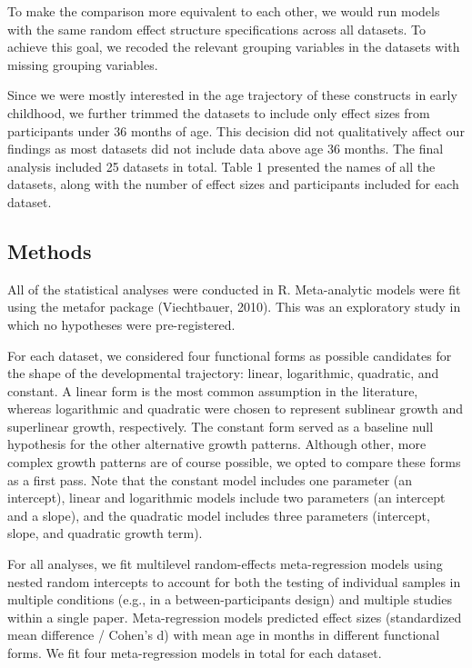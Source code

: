 \documentclass[
  man]{apa6}
\begin{document}
To make the comparison more equivalent to each other, we would run models with the same random effect structure specifications across all datasets. To achieve this goal, we recoded the relevant grouping variables in the datasets with missing grouping variables.

Since we were mostly interested in the age trajectory of these constructs in early childhood, we further trimmed the datasets to include only effect sizes from participants under 36 months of age. This decision did not qualitatively affect our findings as most datasets did not include data above age 36 months. The final analysis included 25 datasets in total. Table 1 presented the names of all the datasets, along with the number of effect sizes and participants included for each dataset.

\hypertarget{methods}{%
\subsection{Methods}\label{methods}}

All of the statistical analyses were conducted in R. Meta-analytic models were fit using the metafor package (Viechtbauer, 2010). This was an exploratory study in which no hypotheses were pre-registered.

For each dataset, we considered four functional forms as possible candidates for the shape of the developmental trajectory: linear, logarithmic, quadratic, and constant. A linear form is the most common assumption in the literature, whereas logarithmic and quadratic were chosen to represent sublinear growth and superlinear growth, respectively. The constant form served as a baseline null hypothesis for the other alternative growth patterns. Although other, more complex growth patterns are of course possible, we opted to compare these forms as a first pass. Note that the constant model includes one parameter (an intercept), linear and logarithmic models include two parameters (an intercept and a slope), and the quadratic model includes three parameters (intercept, slope, and quadratic growth term).

For all analyses, we fit multilevel random-effects meta-regression models using nested random intercepts to account for both the testing of individual samples in multiple conditions (e.g., in a between-participants design) and multiple studies within a single paper. Meta-regression models predicted effect sizes (standardized mean difference / Cohen's d) with mean age in months in different functional forms. We fit four meta-regression models in total for each dataset.
\end{document}
